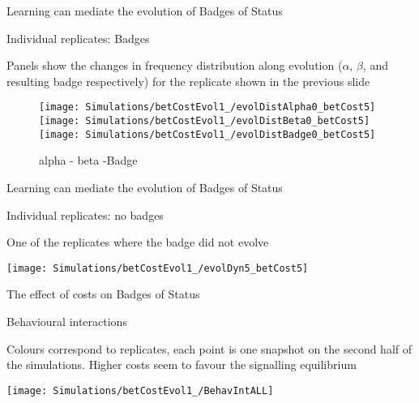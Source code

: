 \documentclass[
  ignorenonframetext,
]{beamer}
\begin{document}
\begin{frame}{Learning can mediate the evolution of Badges of Status}
\protect\hypertarget{learning-can-mediate-the-evolution-of-badges-of-status-2}{}

\begin{block}{Individual replicates: Badges}

\small

Panels show the changes in frequency distribution along evolution
(\(\alpha\), \(\beta\), and resulting badge respectively) for the
replicate shown in the previous slide

\begin{figure}

\texttt{[image: Simulations/betCostEvol1\_/evolDistAlpha0\_betCost5]} \texttt{[image: Simulations/betCostEvol1\_/evolDistBeta0\_betCost5]} \texttt{[image: Simulations/betCostEvol1\_/evolDistBadge0\_betCost5]} \hfill{}

\caption{alpha - beta -Badge}\label{fig:unnamed-chunk-4}
\end{figure}

\end{block}

\end{frame}

\begin{frame}{Learning can mediate the evolution of Badges of Status}
\protect\hypertarget{learning-can-mediate-the-evolution-of-badges-of-status-3}{}

\begin{block}{Individual replicates: no badges}

\small

One of the replicates where the badge did not evolve

\begin{center}\texttt{[image: Simulations/betCostEvol1\_/evolDyn5\_betCost5]} \end{center}

\end{block}

\end{frame}

\begin{frame}{The effect of costs on Badges of Status}
\protect\hypertarget{the-effect-of-costs-on-badges-of-status}{}

\begin{block}{Behavioural interactions}

\small

Colours correspond to replicates, each point is one snapshot on the
second half of the simulations. Higher costs seem to favour the
signalling equilibrium

\begin{center}\texttt{[image: Simulations/betCostEvol1\_/BehavIntALL]} \end{center}

\end{block}

\end{frame}
\end{document}
